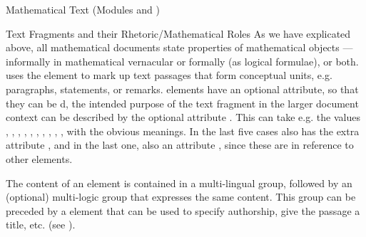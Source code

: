 \begin{tchapter}[id=mtxt,short=Mathematical Text]{Mathematical Text (Modules
  {} and {})}
\begin{tsection}[id=omtext]{Text Fragments and their Rhetoric/Mathematical Roles}
  As we have explicated above, all mathematical documents state properties of mathematical
  objects --- informally in mathematical vernacular or formally (as logical formulae), or
  both. {\omdoc} uses the {} element to mark up text passages that form
  conceptual units, e.g. paragraphs, statements, or remarks.  {} elements
  have an optional {} attribute, so that they can be
  {d}, the intended purpose of the text fragment in the larger
  document context can be described by the optional attribute {}.
  This can take e.g. the values {},
  {}, {},
  {}, {},
  {}, {},
  {}, {},
  {}, {} with the obvious
  meanings. In the last five cases {} also has the extra attribute
  {}, and in the last one, also an attribute
  {}, since these are in reference to other {\omdoc} elements.

  The content of an {} element is {}
  contained in a multi-lingual {} group, followed by an (optional)
  multi-logic {} group that expresses the same content.  This
  {} group can be preceded by a {} element that can be used
  to specify authorship, give the passage a title, etc. (see {}).


\end{tsection}
\end{tchapter}
